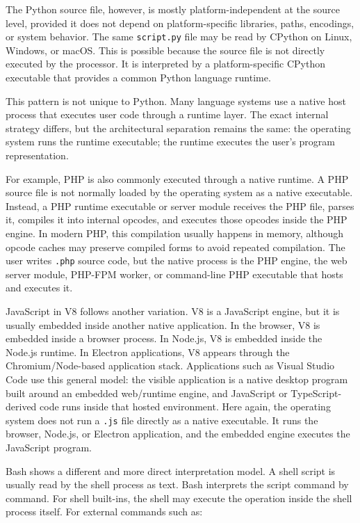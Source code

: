 The Python source file, however, is mostly platform-independent at the source level, provided it does not depend on platform-specific libraries, paths, encodings, or system behavior. The same \texttt{script.py} file may be read by CPython on Linux, Windows, or macOS. This is possible because the source file is not directly executed by the processor. It is interpreted by a platform-specific CPython executable that provides a common Python language runtime.

This pattern is not unique to Python. Many language systems use a native host process that executes user code through a runtime layer. The exact internal strategy differs, but the architectural separation remains the same: the operating system runs the runtime executable; the runtime executes the user's program representation.

For example, PHP is also commonly executed through a native runtime. A PHP source file is not normally loaded by the operating system as a native executable. Instead, a PHP runtime executable or server module receives the PHP file, parses it, compiles it into internal opcodes, and executes those opcodes inside the PHP engine. In modern PHP, this compilation usually happens in memory, although opcode caches may preserve compiled forms to avoid repeated compilation. The user writes \texttt{.php} source code, but the native process is the PHP engine, the web server module, PHP-FPM worker, or command-line PHP executable that hosts and executes it.

JavaScript in V8 follows another variation. V8 is a JavaScript engine, but it is usually embedded inside another native application. In the browser, V8 is embedded inside a browser process. In Node.js, V8 is embedded inside the Node.js runtime. In Electron applications, V8 appears through the Chromium/Node-based application stack. Applications such as Visual Studio Code use this general model: the visible application is a native desktop program built around an embedded web/runtime engine, and JavaScript or TypeScript-derived code runs inside that hosted environment. Here again, the operating system does not run a \texttt{.js} file directly as a native executable. It runs the browser, Node.js, or Electron application, and the embedded engine executes the JavaScript program.

Bash shows a different and more direct interpretation model. A shell script is usually read by the shell process as text. Bash interprets the script command by command. For shell built-ins, the shell may execute the operation inside the shell process itself. For external commands such as:

